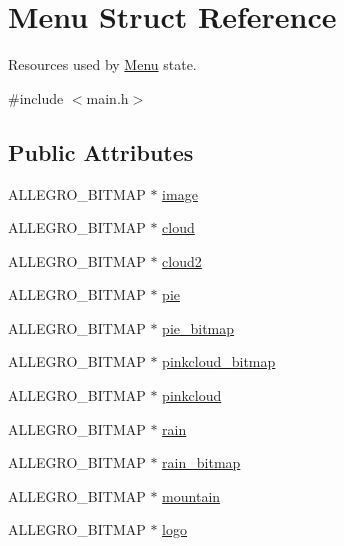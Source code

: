 \hypertarget{structMenu}{\section{Menu Struct Reference}
\label{structMenu}
}


Resources used by \hyperlink{structMenu}{Menu} state.  




{\ttfamily \#include $<$main.\-h$>$}

\subsection*{Public Attributes}
\begin{DoxyCompactItemize}
\item 
A\-L\-L\-E\-G\-R\-O\-\_\-\-B\-I\-T\-M\-A\-P $\ast$ \hyperlink{structMenu_a7ac035a3356434a3ce6eae45f876eba9}{image}
\item 
A\-L\-L\-E\-G\-R\-O\-\_\-\-B\-I\-T\-M\-A\-P $\ast$ \hyperlink{structMenu_a9abb4b7b9f726884aa378e746857b6f2}{cloud}
\item 
A\-L\-L\-E\-G\-R\-O\-\_\-\-B\-I\-T\-M\-A\-P $\ast$ \hyperlink{structMenu_a6ee03b8791791ecca4f9a3b9fb1851c1}{cloud2}
\item 
A\-L\-L\-E\-G\-R\-O\-\_\-\-B\-I\-T\-M\-A\-P $\ast$ \hyperlink{structMenu_a397eb035f88ef8138c4ba29f3fc1d63c}{pie}
\item 
A\-L\-L\-E\-G\-R\-O\-\_\-\-B\-I\-T\-M\-A\-P $\ast$ \hyperlink{structMenu_ab46ce3041264bac0aabde3abd7549877}{pie\-\_\-bitmap}
\item 
A\-L\-L\-E\-G\-R\-O\-\_\-\-B\-I\-T\-M\-A\-P $\ast$ \hyperlink{structMenu_a970ef9c492ae797fc59d22fa6cfead71}{pinkcloud\-\_\-bitmap}
\item 
A\-L\-L\-E\-G\-R\-O\-\_\-\-B\-I\-T\-M\-A\-P $\ast$ \hyperlink{structMenu_aec110fca9c47ccf9aaf6e4e7589b86f2}{pinkcloud}
\item 
A\-L\-L\-E\-G\-R\-O\-\_\-\-B\-I\-T\-M\-A\-P $\ast$ \hyperlink{structMenu_a3ba357f6bd47ac51f9aa9b9c381bbe9f}{rain}
\item 
A\-L\-L\-E\-G\-R\-O\-\_\-\-B\-I\-T\-M\-A\-P $\ast$ \hyperlink{structMenu_a9207cdbfc8c670d9069c9a2c64c6ca95}{rain\-\_\-bitmap}
\item 
A\-L\-L\-E\-G\-R\-O\-\_\-\-B\-I\-T\-M\-A\-P $\ast$ \hyperlink{structMenu_a3a957c0b3a961e3c2be9001c15e82208}{mountain}
\item 
A\-L\-L\-E\-G\-R\-O\-\_\-\-B\-I\-T\-M\-A\-P $\ast$ \hyperlink{structMenu_a57c99e96f0ea7d38a359748533cc0124}{logo}
\item 

\end{DoxyCompactItemize}
